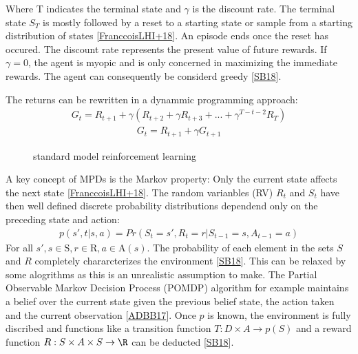 \documentclass[letterpaper,10pt,english]{jupyterBook}
\let\sphinxpxdimen\pdfpxdimen\else\newdimen\sphinxpxdimen
\begin{document}
\sphinxAtStartPar
Where T indicates the terminal state and \(\gamma\) is the discount rate. The terminal state \(S_T\) is mostly followed by a reset to a starting state or sample from a starting distribution of states {[}\hyperlink{cite.Financial_application:id56}{FranccoisLHI+18}{]}. An episode ends once the reset has occured. The discount rate represents the present value of future rewards. If \(\gamma = 0\), the agent is myopic and is only concerned in maximizing the immediate rewards. The agent can consequently be considerd greedy {[}\hyperlink{cite.Financial_application:id55}{SB18}{]}.

\sphinxAtStartPar
The returns can be rewritten in a dynammic programming approach:
\begin{equation*}
\begin{split} G_t = R_{t+1} + \gamma(R_{t+2} + \gamma R_{t+3} + ... + \gamma^{T-t-2}R_T) \end{split}
\end{equation*}\begin{equation*}
\begin{split} G_t = R_{t+1} + \gamma G_{t+1}\end{split}
\end{equation*}
\begin{figure}[htbp]
\centering
\capstart

\noindent\sphinxincludegraphics[width=600\sphinxpxdimen,height=300\sphinxpxdimen]{{standard_model}.png}
\caption{standard model reinforcement learning}\label{\detokenize{Reinforcement_learning:standard-model-fig}}\end{figure}

\sphinxAtStartPar
A key concept of MPDs is the Markov property: Only the current state affects the next state {[}\hyperlink{cite.Financial_application:id56}{FranccoisLHI+18}{]}. The random varianbles (RV) \(R_t\) and \(S_t\) have then well defined discrete probability distributions dependend only on the preceding state and action:
\begin{equation*}
\begin{split} p(s', t| s, a) = Pr(S_t = s', R_t = r | S_{t-1} = s, A_{t-1}=a) \end{split}
\end{equation*}
\sphinxAtStartPar
For all \(s', s \in \mathrm{S} , r \in \mathrm{R}, a \in \mathrm{A}(s) \). The probability of each element in the sets \(S\) and \(R\) completely chararcterizes the environment {[}\hyperlink{cite.Financial_application:id55}{SB18}{]}. This can be relaxed by some alogrithms as this is an unrealistic assumption to make. The Partial Observable Markov Decision Process (POMDP) algorithm for example maintains a belief over the current state given the previous belief state, the action taken and the current observation {[}\hyperlink{cite.Financial_application:id51}{ADBB17}{]}.  Once \(p\) is known, the environment is fully discribed and functions like a transition function \(T : D \times A \to p(S)\) and a reward function \(R: S \times A \times S \to \R\) can be deducted {[}\hyperlink{cite.Financial_application:id55}{SB18}{]}.
\end{document}
